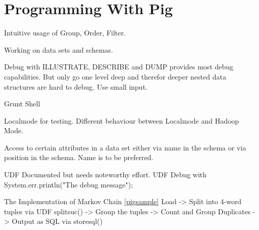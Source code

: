 \section{Programming With Pig}

Intuitive usage of Group, Order, Filter.

Working on data sets and schemas.

Debug with ILLUSTRATE, DESCRIBE and DUMP provides most debug capabilities. But only go one level deep and therefor deeper nested data structures are hard to debug. Use small input. 

Grunt Shell

Localmode for testing. Different behaviour between Localmode and Hadoop Mode.

Access to certain attributes in a data set either via name in the schema or via position in the schema. Name is to be preferred.

UDF Documented but needs noteworthy effort.
UDF Debug with System.err.println("The debug message");                    

The Implementation of Markov Chain \ref{pigsample}
Load -> Split into 4-word tuples via UDF splitsuc() -> Group the tuples -> Count and Group Duplicates -> Output as SQL via storesql()